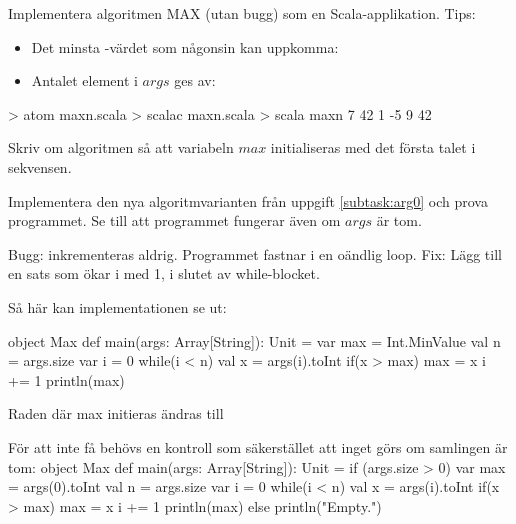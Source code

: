 \Subtask Implementera algoritmen MAX (utan bugg) som en Scala-applikation. Tips:
\begin{itemize}[noitemsep, nolistsep]
\item Det minsta -värdet som någonsin kan uppkomma: 
\item Antalet element i $args$ ges av: 
\end{itemize}

\begin{REPL}
> atom maxn.scala
> scalac maxn.scala
> scala maxn 7 42 1 -5 9
42
\end{REPL}

\Subtask \label{subtask:arg0} Skriv om algoritmen så att variabeln $max$ initialiseras med det första talet i sekvensen.

\Subtask Implementera den nya algoritmvarianten från uppgift \ref{subtask:arg0} och prova programmet. Se till att programmet fungerar även om $args$ är tom.

\SOLUTION


\TaskSolved \what


\SubtaskSolved  Bugg:  inkrementeras aldrig. Programmet fastnar i en oändlig loop. Fix: Lägg till en sats som ökar i med 1, i slutet av while-blocket.

\SubtaskSolved  Så här kan implementationen se ut:
\begin{Code}
object Max {
  def main(args: Array[String]): Unit = {
    var max = Int.MinValue
    val n = args.size
    var i = 0
    while(i < n) {
      val x = args(i).toInt
      if(x > max)  max = x
      i += 1
    }
    println(max)
  }
}
\end{Code}

\SubtaskSolved  Raden där max initieras ändras till 

\SubtaskSolved  För att inte få  behövs en kontroll som säkerstället att inget görs om samlingen  är tom:
object Max {
  def main(args: Array[String]): Unit = if (args.size > 0) {
    var max = args(0).toInt
    val n = args.size
    var i = 0
    while(i < n) {
      val x = args(i).toInt
      if(x > max) {
        max = x
      }
      i += 1
    }
    println(max)
  } else println("Empty.")
}


\QUESTEND






